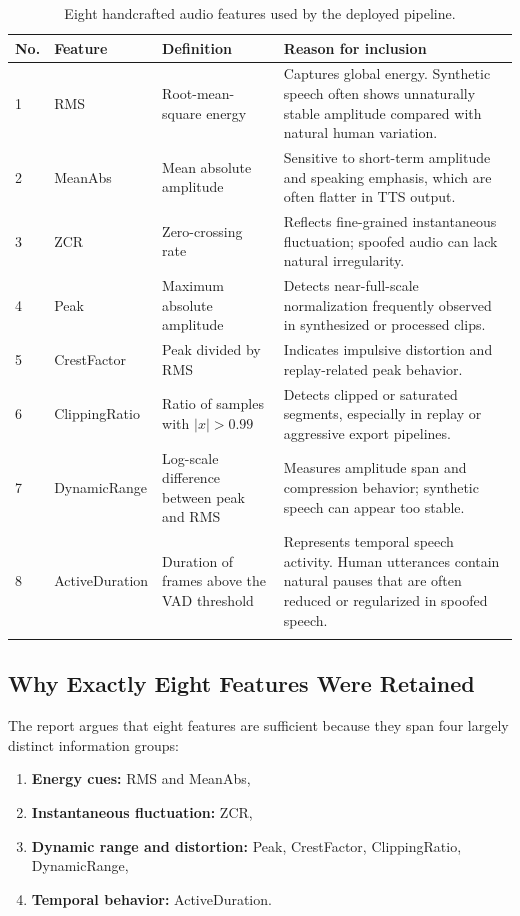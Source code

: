 \documentclass[pdflatex,sn-mathphys-num]{sn-jnl}
\begin{document}
\begin{table}[htbp]
\caption{Eight handcrafted audio features used by the deployed pipeline.}
\label{tab:features}
\centering
\footnotesize
\begin{tabular}{p{0.6cm}p{1.8cm}p{3.1cm}p{5.6cm}}
\toprule
\textbf{No.} & \textbf{Feature} & \textbf{Definition} & \textbf{Reason for inclusion} \\
\midrule
1 & RMS & Root-mean-square energy & Captures global energy. Synthetic speech often shows unnaturally stable amplitude compared with natural human variation. \\
2 & MeanAbs & Mean absolute amplitude & Sensitive to short-term amplitude and speaking emphasis, which are often flatter in TTS output. \\
3 & ZCR & Zero-crossing rate & Reflects fine-grained instantaneous fluctuation; spoofed audio can lack natural irregularity. \\
4 & Peak & Maximum absolute amplitude & Detects near-full-scale normalization frequently observed in synthesized or processed clips. \\
5 & CrestFactor & Peak divided by RMS & Indicates impulsive distortion and replay-related peak behavior. \\
6 & ClippingRatio & Ratio of samples with $|x| > 0.99$ & Detects clipped or saturated segments, especially in replay or aggressive export pipelines. \\
7 & DynamicRange & Log-scale difference between peak and RMS & Measures amplitude span and compression behavior; synthetic speech can appear too stable. \\
8 & ActiveDuration & Duration of frames above the VAD threshold & Represents temporal speech activity. Human utterances contain natural pauses that are often reduced or regularized in spoofed speech. \\
\botrule
\end{tabular}
\end{table}

\subsection{Why Exactly Eight Features Were Retained}

The report argues that eight features are sufficient because they span four largely distinct information groups:

\begin{enumerate}[leftmargin=*]
\item \textbf{Energy cues:} RMS and MeanAbs,
\item \textbf{Instantaneous fluctuation:} ZCR,
\item \textbf{Dynamic range and distortion:} Peak, CrestFactor, ClippingRatio, DynamicRange,
\item \textbf{Temporal behavior:} ActiveDuration.
\end{enumerate}
\end{document}
